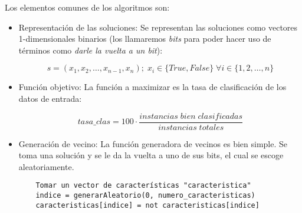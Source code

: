 Los elementos comunes de los algoritmos son:
\begin{itemize}
  \item Representación de las soluciones: Se representan las soluciones como vectores 1-dimensionales binarios (los llamaremos \emph{bits} para poder hacer uso de términos como \emph{darle la vuelta a un bit}):

  $$ s = (x_1,x_2,\ldots,x_{n-1},x_n) ; \; x_i \in \{True,False\} \; \forall i \in \{1,2,\ldots,n\} $$
  \item Función objetivo: La función a maximizar es la tasa de clasificación de los datos de entrada:

  $$ tasa\_clas = 100 \cdot \frac{instancias\;bien\;clasificadas}{instancias\;totales} $$

  \item Generación de vecino: La función generadora de vecinos es bien simple. Se toma una solución y se le da la vuelta a uno de sus bits, el cual se escoge aleatoriamente.
  \begin{verbatim}
    Tomar un vector de características "caracteristica"
    indice = generarAleatorio(0, numero_caracteristicas)
    caracteristicas[indice] = not caracteristicas[indice]
  \end{verbatim}
\end{itemize}

